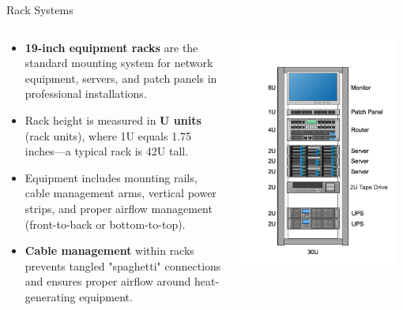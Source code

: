 \documentclass[aspectratio=169]{beamer}
\begin{document}
\begin{frame}{Rack Systems}
    \begin{columns}[T]
        \begin{column}{0.55\textwidth}
            \begin{itemize}
                \item \textbf{19-inch equipment racks} are the standard mounting system for network equipment, servers, and patch panels in professional installations.
                \item Rack height is measured in \textbf{U units} (rack units), where 1U equals 1.75 inches---a typical rack is 42U tall.
                \item Equipment includes mounting rails, cable management arms, vertical power strips, and proper airflow management (front-to-back or bottom-to-top).
                \item \textbf{Cable management} within racks prevents tangled "spaghetti" connections and ensures proper airflow around heat-generating equipment.
            \end{itemize}
        \end{column}
        \begin{column}{0.4\textwidth}
            \centering
            \includegraphics[width=0.95\textwidth]{network_rack_diagram.png}
            

\end{column}
\end{columns}
\end{frame}
\end{document}

